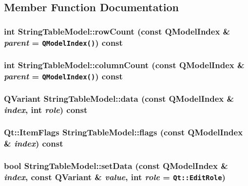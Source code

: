 \subsection{Member Function Documentation}
\subsubsection{\setlength{\rightskip}{0pt plus 5cm}int StringTableModel::rowCount (const QModelIndex \& {\em parent} = {\tt QModelIndex()}) const}\label{classStringTableModel_3622a82e27a79fb313b2a426bd70d5c8}


\subsubsection{\setlength{\rightskip}{0pt plus 5cm}int StringTableModel::columnCount (const QModelIndex \& {\em parent} = {\tt QModelIndex()}) const}\label{classStringTableModel_da3b3f1a87ab8255636a596f2c49818d}


\subsubsection{\setlength{\rightskip}{0pt plus 5cm}QVariant StringTableModel::data (const QModelIndex \& {\em index}, \/  int {\em role}) const}\label{classStringTableModel_ed8ec86430d4836391fd068ec19587f2}


\subsubsection{\setlength{\rightskip}{0pt plus 5cm}Qt::ItemFlags StringTableModel::flags (const QModelIndex \& {\em index}) const}\label{classStringTableModel_c4ac08266d93f95dfffc1a130c1e3daf}


\subsubsection{\setlength{\rightskip}{0pt plus 5cm}bool StringTableModel::setData (const QModelIndex \& {\em index}, \/  const QVariant \& {\em value}, \/  int {\em role} = {\tt Qt::EditRole})}\label{classStringTableModel_de0708c30590e2d40f4c73a105462359}




